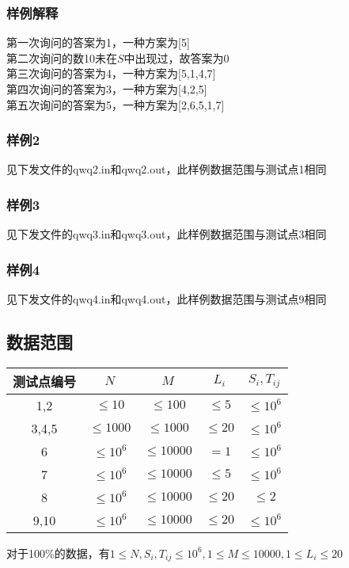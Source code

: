 \documentclass[12pt]{ctexart}
\begin{document}
\subsubsection{样例解释}
\noindent 第一次询问的答案为1，一种方案为[5]\\
第二次询问的数10未在$S$中出现过，故答案为0\\
第三次询问的答案为4，一种方案为[5,1,4,7]\\
第四次询问的答案为3，一种方案为[4,2,5]\\
第五次询问的答案为5，一种方案为[2,6,5,1,7]
\subsubsection{样例2}
见下发文件的qwq2.in和qwq2.out，此样例数据范围与测试点1相同
\subsubsection{样例3}
见下发文件的qwq3.in和qwq3.out，此样例数据范围与测试点3相同
\subsubsection{样例4}
见下发文件的qwq4.in和qwq4.out，此样例数据范围与测试点9相同
\subsection{数据范围}
\begin{center}
	\begin{tabular}{|c|c|c|c|c|}
		\hline 测试点编号&$N$&$M$&$L_i$&$S_i,T_{ij}$\\
		\hline 1,2&$\leq10$&$\leq100$&$\leq5$&$\leq10^6$\\
		\hline 3,4,5&$\leq1000$&$\leq1000$&$\leq20$&$\leq10^6$\\
		\hline 6&$\leq10^6$&$\leq10000$&$=1$&$\leq10^6$\\
		\hline 7&$\leq10^6$&$\leq10000$&$\leq 5$&$\leq10^6$\\
		\hline 8&$\leq10^6$&$\leq10000$&$\leq 20$&$\leq2$\\
		\hline 9,10&$\leq10^6$&$\leq10000$&$\leq 20$&$\leq10^6$\\
		\hline
	\end{tabular}
\end{center}
对于100\%的数据，有$1\le N,S_i,T_{ij}\le10^6,1\le M\le10000,1\le L_i\le20$
\end{document}
